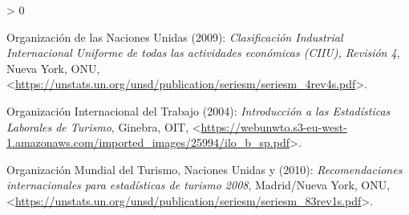 \documentclass[
  openany]{book}
\newlength{\cslhangindent}
\newenvironment{CSLReferences}[2] %
 {%
  \setlength{\parindent}{0pt}
  \ifodd #1 \everypar{\setlength{\hangindent}{\cslhangindent}}\ignorespaces\fi
  \ifnum #2 > 0
  \setlength{\parskip}{#2\baselineskip}
  \fi
 }%
 {}
\begin{document}
\begin{CSLReferences}{1}{0}
\leavevmode\hypertarget{ref-ciiurev4}{}%
Organización de las Naciones Unidas (2009): \emph{Clasificación Industrial Internacional Uniforme de todas las actividades económicas (CIIU), Revisión 4}, Nueva York, ONU, \textless{}\url{https://unstats.un.org/unsd/publication/seriesm/seriesm_4rev4s.pdf}\textgreater.

\leavevmode\hypertarget{ref-oit2004}{}%
Organización Internacional del Trabajo (2004): \emph{Introducción a las Estadísticas Laborales de Turismo}, Ginebra, OIT, \textless{}\url{https://webunwto.s3-eu-west-1.amazonaws.com/imported_images/25994/ilo_b_sp.pdf}\textgreater.

\leavevmode\hypertarget{ref-riet2008}{}%
Organización Mundial del Turismo, Naciones Unidas y (2010): \emph{Recomendaciones internacionales para estadísticas de turismo 2008}, Madrid/Nueva York, ONU, \textless{}\url{https://unstats.un.org/unsd/publication/seriesm/seriesm_83rev1s.pdf}\textgreater.

\end{CSLReferences}
\end{document}
